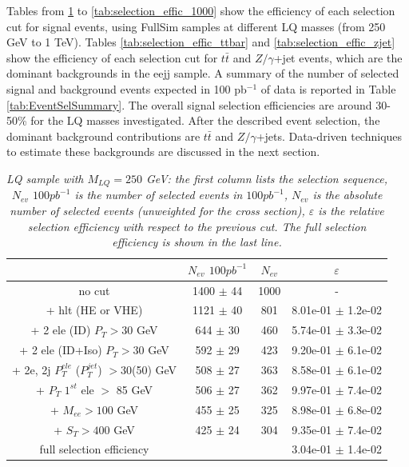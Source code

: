 Tables from \ref{tab:selection_effic_250} to \ref{tab:selection_effic_1000} show the efficiency 
of each selection cut for signal events, using FullSim samples at different LQ masses (from 250 GeV to 1 TeV).
Tables \ref{tab:selection_effic_ttbar} and \ref{tab:selection_effic_zjet} show the efficiency of each selection cut 
for $t\bar{t}$ and $Z/\gamma$+jet events, which are the dominant backgrounds in the eejj sample. 
A summary of the number of selected signal and background events expected in 100 pb$^{-1}$ of data 
is reported in Table \ref{tab:EventSelSummary}. 
The overall signal selection efficiencies are around 30-50\% for the LQ masses investigated. 
After the described event selection, the dominant background contributions 
are $t\bar{t}$ and $Z/\gamma$+jets. Data-driven techniques to estimate these backgrounds
are discussed in the next section.


\begin{table}[htbp]
\begin{center}
\begin{tabular}{|c|c|c|c|}
\hline
\hline
 & $N_{ev}$ $100pb^{-1}$ & $N_{ev}$ & $\varepsilon$ \\
\hline
\hline

no cut &1400 $\pm$ 44& 1000 & - \\
+ hlt (HE or VHE) &1121 $\pm$ 40 & 801 & 8.01e-01 $\pm$ 1.2e-02\\
+ 2 ele (ID) $P_{T} >30$ GeV &644 $\pm$ 30 & 460 & 5.74e-01 $\pm$ 3.3e-02\\
+ 2 ele (ID+Iso) $P_{T} >30$ GeV &592 $\pm$ 29 & 423 & 9.20e-01 $\pm$ 6.1e-02\\
+ 2e, 2j $P_{T}^{ele}$ ($P_{T}^{jet}$) $>$30(50) GeV &508 $\pm$ 27& 363 & 8.58e-01 $\pm$ 6.1e-02\\
+ $P_{T}$ $1^{st}$ ele $>$ 85 GeV &506 $\pm$ 27& 362 & 9.97e-01 $\pm$ 7.4e-02\\
+ $M_{ee} >100$ GeV& 455 $\pm$ 25& 325 & 8.98e-01 $\pm$ 6.8e-02\\
+ $S_{T} >400$ GeV &425 $\pm$ 24& 304 & 9.35e-01 $\pm$ 7.4e-02\\
\hline

full selection efficiency& &  & 3.04e-01 $\pm$ 1.4e-02\\
\hline
\end{tabular}
\end{center}
\caption{\small \sl LQ sample with $M_{LQ}=250$ GeV: the first column lists the selection sequence, $N_{ev}$ $100pb^{-1}$ is the number of selected events in $100pb^{-1}$, $N_{ev}$ is the absolute number of selected events (unweighted for the cross section), $\varepsilon$ is the relative selection efficiency with respect to the previous cut. The full selection efficiency is shown in the last line.}
\label{tab:selection_effic_250}
\end{table}

